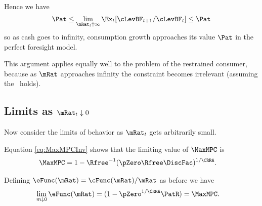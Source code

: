 \documentclass[./BufferStockTheory.tex]{subfiles}
\begin{document}
Hence we have
\begin{equation}
  {\Pat}  \leq \lim_{\mRat_{t} \uparrow \infty} \Ex_{t}[\cLevBF_{t+1}/\cLevBF_{t}] \leq {\Pat} \nonumber
\end{equation}
so as cash goes to infinity, consumption growth approaches its
value $\Pat$ in the perfect foresight model.

This argument applies equally well to the problem of the restrained
consumer, because as $\mRat$ approaches infinity the constraint becomes
irrelevant (assuming the \FHWC~holds).

\begin{comment}
Of course, the constraint never becomes irrelevant if human wealth is
infinite.  We ruled out infinite human wealth at the beginning of this
section by assuming $\Rfree> \PGro$.  If this finite human wealth
condition does not hold, it is possible to show that for any finite
horizon consumer the marginal propensity to consume approaches the
finite-horizon perfect foresight MPC as wealth approaches infinity.
However, as the horizon gets longer, the perfect foresight MPC
approaches zero.  It can be shown therefore that the limiting MPC for
the converged consumption function approaches (but never reaches)
zero.  (This is why we chose $\MinMinMPC=0$ if the \FHWC~fails
in the proofs above.)
\end{comment}

\hypertarget{LimitsAsmtToZero}{}
\subsection{Limits as $\mRat_t \downarrow 0$}

\label{subsec:LimitsAsmtToZero} Now consider the limits of behavior as $\mRat_{t}$ gets
arbitrarily small.

Equation \eqref{eq:MaxMPCInv} shows that the limiting value of
$\MaxMPC$ is
\begin{equation}\begin{gathered}\begin{aligned}
 \MaxMPC  & = 1-{\Rfree}^{-1}(\pZero  \Rfree\DiscFac)^{1/\CRRA}. \nonumber
\end{aligned}\end{gathered}\end{equation}

Defining $\eFunc(\mRat)=\cFunc(\mRat)/\mRat$ as before we have
\begin{equation}\begin{gathered}\begin{aligned}
  \lim_{m \downarrow 0} \eFunc(\mRat)  & = (1-\pZero^{1/\CRRA}\PatR) = \MaxMPC \nonumber.
\end{aligned}\end{gathered}\end{equation}
\end{document}
